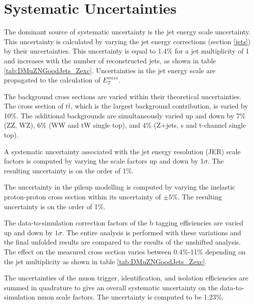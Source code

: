 \documentclass[oneside, letterpaper, oldfontcommands]{memoir}
\begin{document}
\section{Systematic Uncertainties}

\qquad The dominant source of systematic uncertainty is the jet energy scale uncertainty. This uncertainty is calculated by varying the jet energy corrections (section \ref{jets}) by their uncertainties. This uncertainty is equal to 1.4\% for a jet multiplicity of 1 and increases with the number of reconstructed jets, as shown in table \ref{tab:DMuZNGoodJets_Zexc}. Uncertainties in the jet energy scale are propagated to the calculation of $E_{T}^{miss}$.

\qquad The background cross sections are varied within their theoretical uncertainties. The cross section of $t\bar{t}$, which is the largest background contribution, is varied by 10\%. The additional backgrounds are simultaneously varied up and down by 7\% (ZZ, WZ), 6\% (WW and tW single top), and 4\% (Z+jets, s and t-channel single top). 


\qquad A systematic uncertainty associated with the jet energy resolution (JER) scale factors is computed by varying the scale factors up and down by 1$\sigma$. The resulting uncertainty is on the order of 1\%.

\qquad The uncertainty in the pileup modelling is computed by varying the inelastic proton-proton cross section within its uncertainty of $\pm 5\%$. The resulting uncertainty is on the order of 1\%.

\qquad The data-to-simulation correction factors of the b tagging efficiencies are varied up and down by $1 \sigma$. The entire analysis is performed with these variations and the final unfolded results are compared to the results of the unshifted analysis. The effect on the measured cross section varies between 0.4\%-11\% depending on the jet multiplicity as shown in table \ref{tab:DMuZNGoodJets_Zexc}.

\qquad The uncertainties of the muon trigger, identification, and isolation efficiencies are summed in quadrature to give an overall systematic uncertainty on the data-to-simulation muon scale factors. The uncertainty is computed to be 1.23\%.
\end{document}
